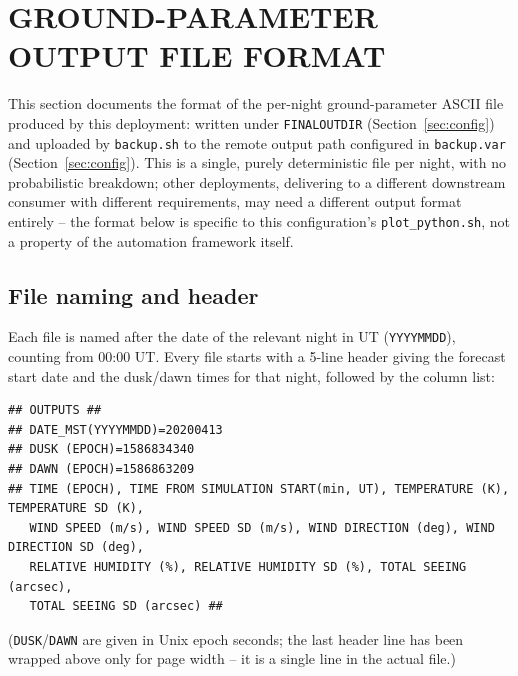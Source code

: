 \section{GROUND-PARAMETER OUTPUT FILE FORMAT}
\label{sec:output-files}
This section documents the format of the per-night ground-parameter ASCII file produced by this
deployment: written under \texttt{FINALOUTDIR} (Section~\ref{sec:config}) and uploaded by
\texttt{backup.sh} to the remote output path configured in \texttt{backup.var} (Section~\ref{sec:config}). This is a single, purely deterministic file per night, with no probabilistic
breakdown; other deployments, delivering to a different downstream consumer with different requirements,
may need a different output format entirely -- the format below is specific to this configuration's
\texttt{plot\_python.sh}, not a property of the automation framework itself.

\subsection{File naming and header}
Each file is named after the date of the relevant night in UT (\texttt{YYYYMMDD}), counting from
00:00 UT. Every file starts with a 5-line header giving the forecast start date and the dusk/dawn
times for that night, followed by the column list:
\begin{lstlisting}
## OUTPUTS ##
## DATE_MST(YYYYMMDD)=20200413
## DUSK (EPOCH)=1586834340
## DAWN (EPOCH)=1586863209
## TIME (EPOCH), TIME FROM SIMULATION START(min, UT), TEMPERATURE (K), TEMPERATURE SD (K),
   WIND SPEED (m/s), WIND SPEED SD (m/s), WIND DIRECTION (deg), WIND DIRECTION SD (deg),
   RELATIVE HUMIDITY (%), RELATIVE HUMIDITY SD (%), TOTAL SEEING (arcsec),
   TOTAL SEEING SD (arcsec) ##
\end{lstlisting}
(\texttt{DUSK}/\texttt{DAWN} are given in Unix epoch seconds; the last header line has been wrapped
above only for page width -- it is a single line in the actual file.)

